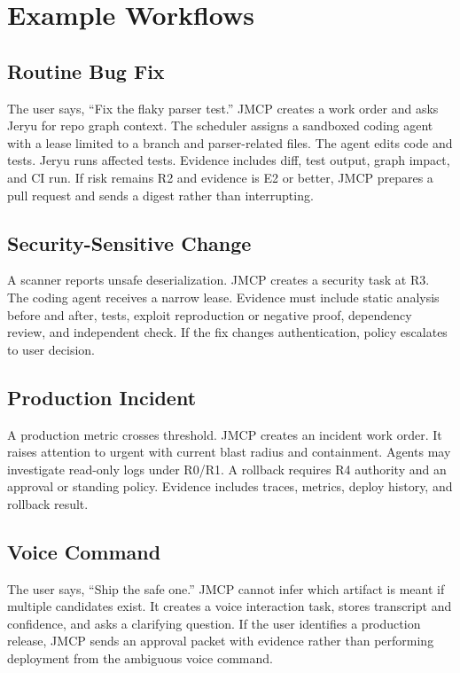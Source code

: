 \documentclass[10pt,journal,onecolumn]{IEEEtran}
\begin{document}
\section{Example Workflows}
\subsection{Routine Bug Fix}
The user says, ``Fix the flaky parser test.'' JMCP creates a work order and asks Jeryu for repo graph context. The scheduler assigns a sandboxed coding agent with a lease limited to a branch and parser-related files. The agent edits code and tests. Jeryu runs affected tests. Evidence includes diff, test output, graph impact, and CI run. If risk remains R2 and evidence is E2 or better, JMCP prepares a pull request and sends a digest rather than interrupting.

\subsection{Security-Sensitive Change}
A scanner reports unsafe deserialization. JMCP creates a security task at R3. The coding agent receives a narrow lease. Evidence must include static analysis before and after, tests, exploit reproduction or negative proof, dependency review, and independent check. If the fix changes authentication, policy escalates to user decision.

\subsection{Production Incident}
A production metric crosses threshold. JMCP creates an incident work order. It raises attention to urgent with current blast radius and containment. Agents may investigate read-only logs under R0/R1. A rollback requires R4 authority and an approval or standing policy. Evidence includes traces, metrics, deploy history, and rollback result.

\subsection{Voice Command}
The user says, ``Ship the safe one.'' JMCP cannot infer which artifact is meant if multiple candidates exist. It creates a voice interaction task, stores transcript and confidence, and asks a clarifying question. If the user identifies a production release, JMCP sends an approval packet with evidence rather than performing deployment from the ambiguous voice command.
\end{document}
